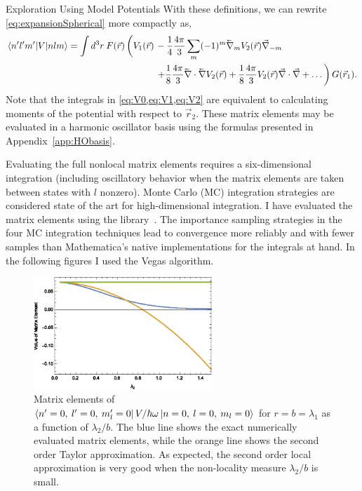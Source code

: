 \begin{section}{Exploration Using Model Potentials\label{sec:toyModel}}
With these definitions, we can rewrite \eqref{eq:expansionSpherical} more compactly as,
\begin{equation}\label{eq:expansion2}
\begin{split}
\braket{n' l' m'| V | n l m} =  \int d^3r\: F(\vec{r})\left( \vphantom{\frac{1}{2}}V_1(\vec{r})\right.&-\frac{1}{4}\frac{4\pi}{3}\sum_m(-1)^m \lvec{\nabla}_{m}  V_2(\vec{r}) \vec{\nabla}_{-m} \\
&\left.+\frac{1}{8}\frac{4\pi}{3}\lvec{\nabla}\cdot\lvec{\nabla} V_2(\vec{r})+\frac{1}{8}\frac{4\pi}{3}V_2(\vec{r})\vec{\nabla}\cdot\vec{\nabla}+\dots\right) G(\vec{r}_1).
\end{split}
\end{equation}
Note that the integrals in \cref{eq:V0,eq:V1,eq:V2}  are equivalent to calculating moments of the potential with respect to $\vec{r}_2$. These matrix elements may be evaluated in a harmonic oscillator basis using the formulas presented in Appendix~\ref{app:HObasis}.

Evaluating the full nonlocal matrix elements requires a six-dimensional integration (including oscillatory behavior when the matrix elements are taken between states with $l$ nonzero). Monte Carlo (MC) integration strategies are considered state of the art for high-dimensional integration. I have evaluated the matrix elements using the {} library~\cite{Hahn200578}. The importance sampling strategies in the four MC integration techniques lead to convergence more reliably and with fewer samples than Mathematica's native implementations for the integrals at hand. In the following figures I used the {\ttfamily Vegas} algorithm.

\begin{figure}[htb]
\centering \includegraphics[width=0.6\textwidth]{LocalExpansion/Figures/ToyPotential000000} 
\caption[Matrix elements of the toy potential with varying $\lambda_2$]{Matrix elements of $\braket{n'=0,\: l'=0,\: m_l'=0 |\, V/\hbar\omega \, | n=0,\: l=0,\: m_l=0}$ for $r=b=\lambda_1$ as a function of $\lambda_2/b$. The blue line shows the exact numerically evaluated matrix elements, while the orange line shows the second order Taylor approximation. As expected, the second order local approximation is very good when the non-locality measure $\lambda_2/b$ is small.
\label{fig:gaussToy1}}
\end{figure}


\end{section}
